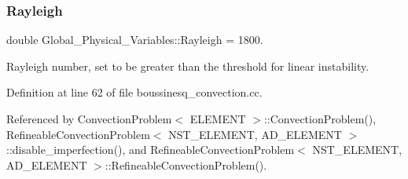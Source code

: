 \subsubsection{\texorpdfstring{Rayleigh}{Rayleigh}}
{\footnotesize\ttfamily double Global\+\_\+\+Physical\+\_\+\+Variables\+::\+Rayleigh = 1800.}



Rayleigh number, set to be greater than the threshold for linear instability. 



Definition at line 62 of file boussinesq\+\_\+convection.\+cc.



Referenced by Convection\+Problem$<$ E\+L\+E\+M\+E\+N\+T $>$\+::\+Convection\+Problem(), Refineable\+Convection\+Problem$<$ N\+S\+T\+\_\+\+E\+L\+E\+M\+E\+N\+T, A\+D\+\_\+\+E\+L\+E\+M\+E\+N\+T $>$\+::disable\+\_\+imperfection(), and Refineable\+Convection\+Problem$<$ N\+S\+T\+\_\+\+E\+L\+E\+M\+E\+N\+T, A\+D\+\_\+\+E\+L\+E\+M\+E\+N\+T $>$\+::\+Refineable\+Convection\+Problem().

